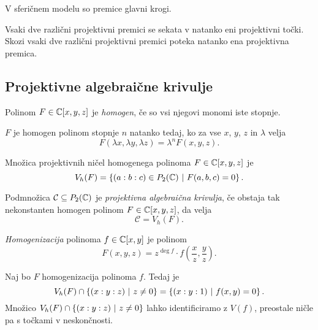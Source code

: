 \begin{opomba}
V sferičnem modelu so premice glavni krogi.
\end{opomba}

\begin{opomba}
Vsaki dve različni projektivni premici se sekata v natanko eni
projektivni točki. Skozi vsaki dve različni projektivni premici
poteka natanko ena projektivna premica.
\end{opomba}

\newpage

\subsection{Projektivne algebraične krivulje}

\begin{definicija}
Polinom $F \in \mathbb{C}[x,y,z]$ je \emph{homogen},
če so vsi njegovi monomi iste stopnje.
\end{definicija}

\begin{opomba}
$F$ je homogen polinom stopnje $n$ natanko tedaj, ko za vse $x$,
$y$, $z$ in $\lambda$ velja
\[
F(\lambda x, \lambda y, \lambda z) = \lambda^n F(x, y, z).
\]
\end{opomba}

\begin{definicija}
Množica projektivnih ničel homogenega polinoma $F \in \mathbb{C}[x, y, z]$
je
\[
V_h(F) = \left\{(a : b : c) \in P_2(\mathbb{C})~\middle\vert~F(a, b, c) = 0\right\}.
\]
\end{definicija}

\begin{definicija}
Podmnožica $\mathcal{C} \subseteq P_2(\mathbb{C})$ je
\emph{projektivna algebraična krivulja},
če obstaja tak nekonstanten homogen polinom $F \in \mathbb{C}[x, y, z]$,
da velja
\[
\mathcal{C} = V_h(F).
\]
\end{definicija}

\begin{definicija}
\emph{Homogenizacija} polinoma
$f \in \mathbb{C}[x,y]$ je polinom
\[
F(x, y, z) =
z^{\deg f} \cdot f\left(\frac{x}{z}, \frac{y}{z} \right).
\]
\end{definicija}


\begin{opomba}
Naj bo $F$ homogenizacija polinoma $f$. Tedaj je
\[
V_h(F) \cap \left\{(x : y : z)~\middle\vert~z \ne 0\right\} =
\left\{(x : y : 1)~\middle\vert~f(x, y) = 0\right\}.
\]
Množico $V_h(F) \cap \left\{(x : y : z)~\middle\vert~z \ne 0\right\}$ lahko
identificiramo z $V(f)$, preostale ničle pa s točkami v
neskončnosti.
\end{opomba}

